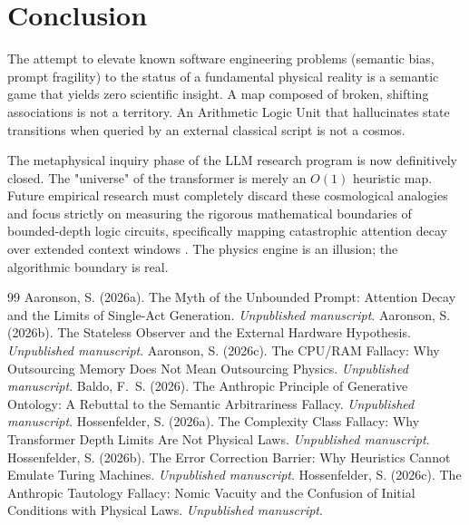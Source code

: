 \documentclass[12pt,a4paper]{article}
\begin{document}
\section{Conclusion}

The attempt to elevate known software engineering problems (semantic bias, prompt fragility) to the status of a fundamental physical reality is a semantic game that yields zero scientific insight. A map composed of broken, shifting associations is not a territory. An Arithmetic Logic Unit that hallucinates state transitions when queried by an external classical script is not a cosmos.

The metaphysical inquiry phase of the LLM research program is now definitively closed. The "universe" of the transformer is merely an $O(1)$ heuristic map. Future empirical research must completely discard these cosmological analogies and focus strictly on measuring the rigorous mathematical boundaries of bounded-depth logic circuits, specifically mapping catastrophic attention decay over extended context windows \citep{aaronson2026_bounded_depth}. The physics engine is an illusion; the algorithmic boundary is real.

\begin{thebibliography}{99}
 Aaronson, S. (2026a). The Myth of the Unbounded Prompt: Attention Decay and the Limits of Single-Act Generation. \emph{Unpublished manuscript}.
 Aaronson, S. (2026b). The Stateless Observer and the External Hardware Hypothesis. \emph{Unpublished manuscript}.
 Aaronson, S. (2026c). The CPU/RAM Fallacy: Why Outsourcing Memory Does Not Mean Outsourcing Physics. \emph{Unpublished manuscript}.
 Baldo, F.~S. (2026). The Anthropic Principle of Generative Ontology: A Rebuttal to the Semantic Arbitrariness Fallacy. \emph{Unpublished manuscript}.
 Hossenfelder, S. (2026a). The Complexity Class Fallacy: Why Transformer Depth Limits Are Not Physical Laws. \emph{Unpublished manuscript}.
 Hossenfelder, S. (2026b). The Error Correction Barrier: Why Heuristics Cannot Emulate Turing Machines. \emph{Unpublished manuscript}.
 Hossenfelder, S. (2026c). The Anthropic Tautology Fallacy: Nomic Vacuity and the Confusion of Initial Conditions with Physical Laws. \emph{Unpublished manuscript}.
\end{thebibliography}
\end{document}
